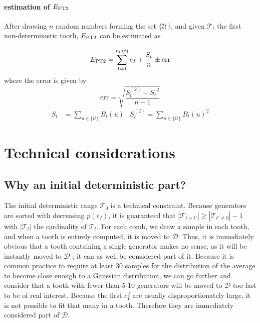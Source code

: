 \documentclass[./thesis.tex]{subfiles}
\begin{document}
\paragraph{estimation of $E_\text{PT2}$}

After drawing $n$ random numbers forming the set $\{\mathcal{U}\}$, and given $\mathcal{T}_t$ the first non-deterministic tooth, $E_\text{PT2}$ can be estimated as 

\begin{equation}
E_\text{PT2} = \sum_{I=1}^{n_0(t)} e_I + \frac{S_{t}}{n}  \pm \text{err}
\end{equation}
where the error is given by
\begin{equation}
\text{err}  = \sqrt{\frac{S_{t}^{(2)} - {S_{t}}^2}{n-1} } 
\end{equation}
\begin{align}
S_{t} & = \sum_{u \in \{\mathcal{U}\}} B_{t}(u) & 
S^{(2)}_{t} = \sum_{u \in \{\mathcal{U}\}} B_{t}(u)^2
\end{align}


\section{Technical considerations}


\subsection{Why an initial deterministic part?}

The initial deterministic range $\mathcal{T}_0$ is a technical constraint.
Because generators are sorted with decreasing $p(e_I)$, it is guaranteed that $|\mathcal{T}_{t>t'}| \geq |\mathcal{T}_{t' \neq 0}|-1$ with $|\mathcal{T}_t|$ the cardinality of $\mathcal{T}_t$.
For each comb, we draw a sample in each tooth, and when a tooth is entirely computed, it is moved to $\mathcal{D}$. Thus, it is immediately obvious that a tooth containing a single generator makes no sense, as it will be instantly moved to $\mathcal{D}$ ; it can as well be considered part of it. Because it is common practice to require at least 30 samples for the distribution of the average to become close enough to a Gaussian distribution,\cite{Hogg2014Jan} we can go further and consider that a tooth with fewer than 5-10 generators will be moved to $\mathcal{D}$ too fast to be of real interest. Because the first $c_I^2$ are usually disproportionately large, it is not possible to fit that many in a tooth. Therefore they are immediately considered part of $\mathcal{D}$.
\end{document}
